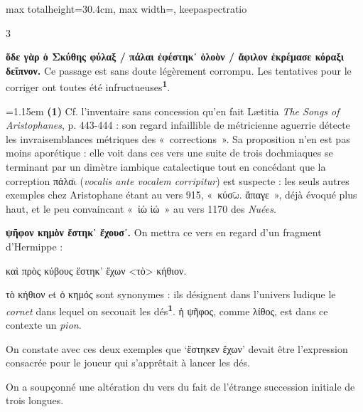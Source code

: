\documentclass[11pt,twoside]{book}
\newcommand{\italique}[1]{\textit{#1}}
\newcommand{\citComm}[1]{\begin{quoting}[vskip=0.4pt,leftmargin=0.7em,rightmargin=0.2em]#1\end{quoting}}
\newcommand{\lettreBreve}[1]{$\breve{\mbox{#1}}$}
\newcommand{\latin}[1]{\textit{#1}}
\newcommand{\marqueur}[1]{\textsuperscript{\color{rubricRed}\textbf{#1}}}
\begin{document}
\begin{adjustbox}{max totalheight=30.4cm, max width=\textwidth, keepaspectratio}
\begin{minipage}{\textwidth}
{\begin{multicols}{3}
\par\vspace{1.5pt}
 \textbf{ὅδε γὰρ ὁ Σκύθης φύλαξ / πάλαι ἐφέστηκ᾽ ὀλοὸν / ἄφιλον ἐκρέμασε κόραξι δεῖπνον.} Ce passage est sans doute légèrement corrompu. Les tentatives pour le corriger ont toutes été infructueuses\marqueur{1}.
\par\vspace{1.5pt}
\par\vspace{1.2pt}\par\nopagebreak\vspace{1pt}\noindent\hangindent=1.15em {\color{sepiaNote}\textbf{(1)}} Cf. l'inventaire sans concession qu'en fait Lætitia \italique{The Songs of Aristophanes}, p. 443-444 : son regard infaillible de métricienne aguerrie détecte les invraisemblances métriques des «~corrections~». Sa proposition n'en est pas moins aporétique : elle voit dans ces vers une suite de trois dochmiaques se terminant par un dimètre iambique catalectique tout en concédant que la correption πάλα\lettreBreve{ι} (\latin{vocalis ante vocalem corripitur}) est suspecte : les seuls autres exemples chez Aristophane étant au vers 915, «~κύσ\lettreBreve{ω}. ἄπαγε~», déjà évoqué plus haut, et le peu convaincant «~ἰὼ ἰώ~» au vers 1170 des \italique{Nuées}.
\par\vspace{1.5pt}
 \textbf{ψῆφον κημὸν ἕστηκ᾽ ἔχουσ᾽.} On mettra ce vers en regard d'un fragment d'Hermippe :
\citComm{καὶ πρὸς κύβους ἕστηκ' ἔχων <τὸ> κήθιον.}
\par\vspace{1.5pt}
\noindent τὸ κήθιον et ὁ κημός sont synonymes : ils désignent dans l'univers ludique le \italique{cornet} dans lequel on secouait  les dés\marqueur{1}. ἡ ψῆφος, comme λίθος, est dans ce contexte un \italique{pion}.
\par\vspace{1.5pt}
\noindent On constate avec ces deux exemples que `ἕστηκεν ἔχων' devait être l'expression consacrée pour le joueur qui s'apprêtait à lancer les dés.
\par\vspace{1.5pt}
\noindent On a soupçonné une altération du vers du fait de l'étrange succession initiale de trois longues.
\par\vspace{1.5pt}

\end{multicols}}
\end{minipage}
\end{adjustbox}
\end{document}
